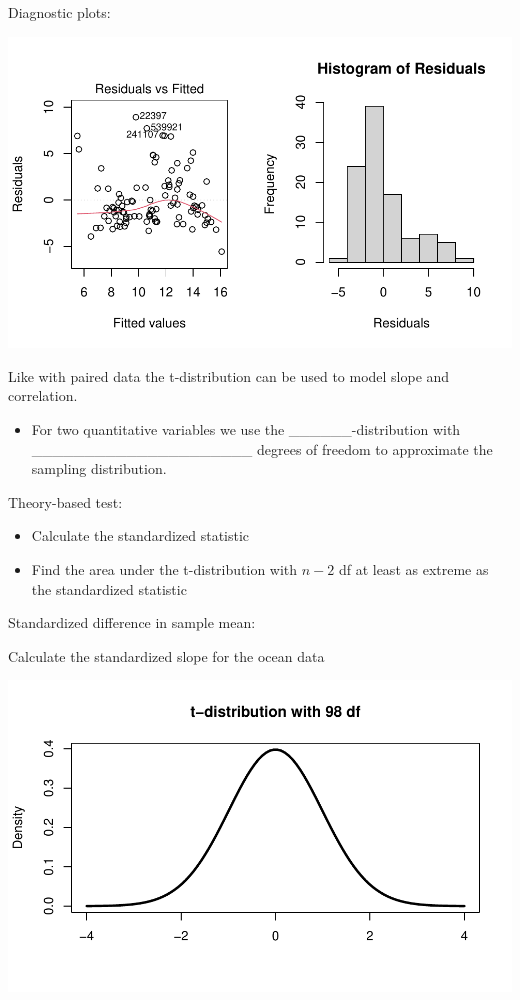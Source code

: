 \documentclass[
]{report}
\providecommand{\tightlist}{%
  \setlength{\itemsep}{0pt}\setlength{\parskip}{0pt}}
\begin{document}
\newpage

Diagnostic plots:

\begin{center}\includegraphics[width=0.7\linewidth]{13-LN013-regression_files/figure-latex/unnamed-chunk-11-1} \end{center}

Like with paired data the t-distribution can be used to model slope and correlation.


\begin{itemize}
\tightlist
\item
  For two quantitative variables we use the \_\_\_\_\_\_-distribution
  with \_\_\_\_\_\_\_\_\_\_\_\_\_\_\_\_\_\_\_\_\_ degrees of freedom to approximate the sampling distribution.
\end{itemize}


Theory-based test:

\begin{itemize}
\item
  Calculate the standardized statistic
\item
  Find the area under the t-distribution with \(n - 2\) df at least as extreme as the standardized statistic
\end{itemize}

Standardized difference in sample mean:

\vspace{0.8in}

Calculate the standardized slope for the ocean data

\vspace{1in}

\begin{center}\includegraphics[width=0.7\linewidth]{13-LN013-regression_files/figure-latex/pvalueoce-1} \end{center}
\end{document}
